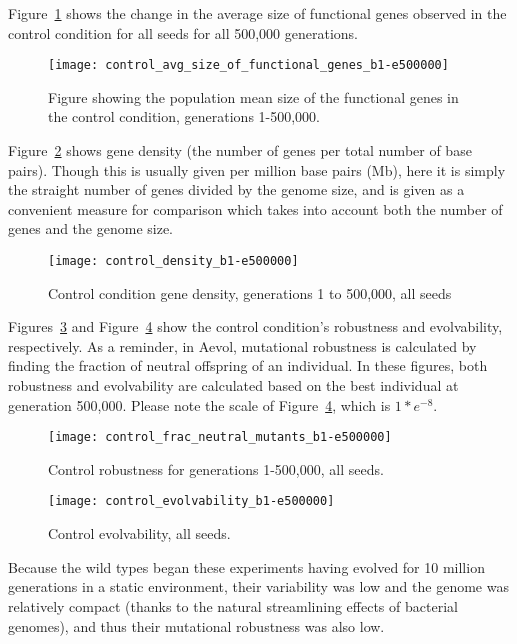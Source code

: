 Figure~\ref{fig:control_avg_size_of_functional_genes_b1-e500000} shows the change in the average size of functional genes observed in the control condition for all seeds for all 500,000 generations.  

\begin{figure}[H]
	\texttt{[image: control\_avg\_size\_of\_functional\_genes\_b1-e500000]}
	\caption[Control avg. size of functional genes]{Figure showing the population mean size of the functional genes in the control condition, generations 1-500,000.}
	\label{fig:control_avg_size_of_functional_genes_b1-e500000}
\end{figure}

Figure~\ref{fig:control_gene_density} shows gene density (the number of genes per total number of base pairs). Though this is usually given per million base pairs (Mb), here it is simply the straight number of genes divided by the genome size, and is given as a convenient measure for comparison which takes into account both the number of genes and the genome size. 

\begin{figure}[H]
	\centering
	\texttt{[image: control\_density\_b1-e500000]}
	\caption[Control gene density]{Control condition gene density, generations 1 to 500,000, all seeds}
	\label{fig:control_gene_density}
\end{figure}

Figures~\ref{fig:control_robustness} and Figure~\ref{fig:control_evolvability} show the control condition's robustness and evolvability, respectively. As a reminder, in Aevol, mutational robustness is calculated by finding the fraction of neutral offspring of an individual. In these figures, both robustness and evolvability are calculated based on the best individual at generation 500,000. Please note the scale of Figure~\ref{fig:control_evolvability}, which is $1*e^{-8}$.

\begin{figure}[H]
	\centering
	\texttt{[image: control\_frac\_neutral\_mutants\_b1-e500000]}
	\caption[Control robustness]{Control robustness for generations 1-500,000, all seeds.}
	\label{fig:control_robustness}
\end{figure}

\begin{figure}[H]
	\centering
	\texttt{[image: control\_evolvability\_b1-e500000]}
	\caption[Control evolvability]{Control evolvability, all seeds.}
	\label{fig:control_evolvability}
\end{figure}
Because the wild types began these experiments having evolved for 10 million generations in a static environment, their variability was low and the genome was relatively compact (thanks to the natural streamlining effects of bacterial genomes), and thus their mutational robustness was also low.
